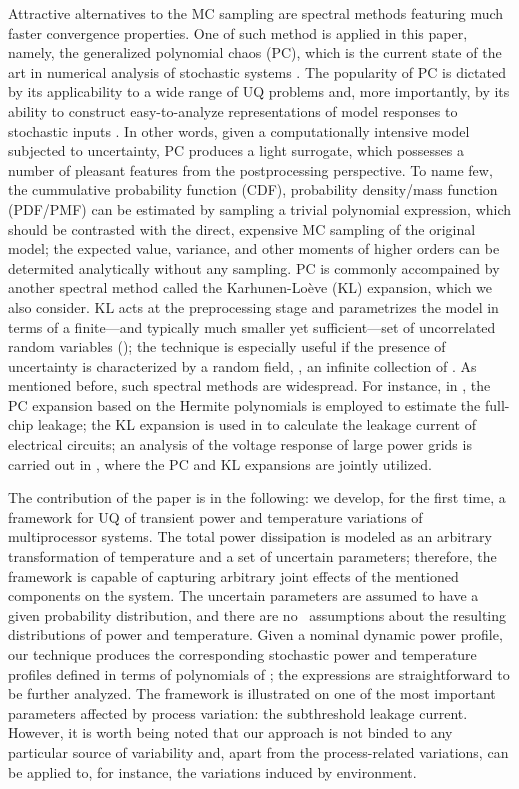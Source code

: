 Attractive alternatives to the MC sampling are spectral methods \cite{xiu2010, maitre2010, ghanem1991} featuring much faster convergence properties. One of such method is applied in this paper, namely, the generalized polynomial chaos (PC), which is the current state of the art in numerical analysis of stochastic systems \cite{xiu2010}. The popularity of PC is dictated by its applicability to a wide range of UQ problems and, more importantly, by its ability to construct easy-to-analyze representations of model responses to stochastic inputs \cite{eldred2009}. In other words, given a computationally intensive model subjected to uncertainty, PC produces a light surrogate, which possesses a number of pleasant features from the postprocessing perspective. To name few, the cummulative probability function (CDF), probability density/mass function (PDF/PMF) can be estimated by sampling a trivial polynomial expression, which should be contrasted with the direct, expensive MC sampling of the original model; the expected value, variance, and other moments of higher orders can be determited analytically without any sampling. PC is commonly accompained by another spectral method called the Karhunen-Lo\`{e}ve (KL) expansion, which we also consider. KL acts at the preprocessing stage and parametrizes the model in terms of a finite---and typically much smaller yet sufficient---set of uncorrelated random variables (\rvs); the technique is especially useful if the presence of uncertainty is characterized by a random field, \ie, an infinite collection of \rvs. As mentioned before, such spectral methods are widespread. For instance, in \cite{shen2009}, the PC expansion based on the Hermite polynomials is employed to estimate the full-chip leakage; the KL expansion is used in \cite{bhardwaj2006} to calculate the leakage current of electrical circuits; an analysis of the voltage response of large power grids is carried out in \cite{ghanta2006}, where the PC and KL expansions are jointly utilized.

The contribution of the paper is in the following: we develop, for the first time, a framework for UQ of transient power and temperature variations of multiprocessor systems. The total power dissipation is modeled as an arbitrary transformation of temperature and a set of uncertain parameters; therefore, the framework is capable of capturing arbitrary joint effects of the mentioned components on the system. The uncertain parameters are assumed to have a given probability distribution, and there are no \apriori\ assumptions about the resulting distributions of power and temperature. Given a nominal dynamic power profile, our technique produces the corresponding stochastic power and temperature profiles defined in terms of polynomials of \rvs; the expressions are straightforward to be further analyzed. The framework is illustrated on one of the most important parameters affected by process variation: the subthreshold leakage current. However, it is worth being noted that our approach is not binded to any particular source of variability and, apart from the process-related variations, can be applied to, for instance, the variations induced by environment.

